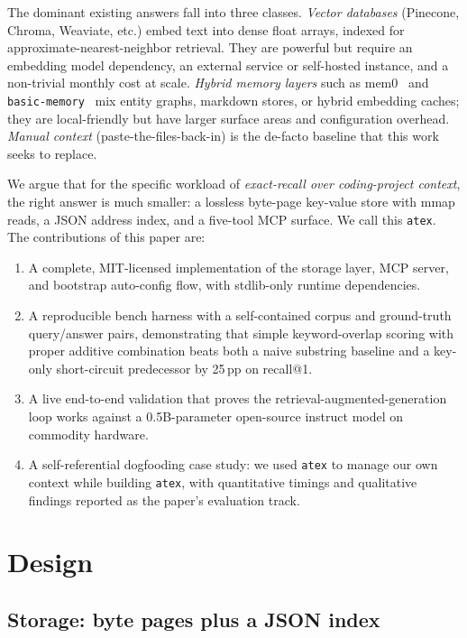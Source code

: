 \documentclass[10pt,letterpaper]{article}
\begin{document}
The dominant existing answers fall into three classes. \textit{Vector databases} (Pinecone, Chroma, Weaviate, etc.) embed text into dense float arrays, indexed for approximate-nearest-neighbor retrieval. They are powerful but require an embedding model dependency, an external service or self-hosted instance, and a non-trivial monthly cost at scale. \textit{Hybrid memory layers} such as mem0~\cite{mem0} and \texttt{basic-memory}~\cite{basicmemory} mix entity graphs, markdown stores, or hybrid embedding caches; they are local-friendly but have larger surface areas and configuration overhead. \textit{Manual context} (paste-the-files-back-in) is the de-facto baseline that this work seeks to replace.

We argue that for the specific workload of \emph{exact-recall over coding-project context}, the right answer is much smaller: a lossless byte-page key-value store with mmap reads, a JSON address index, and a five-tool MCP surface. We call this \texttt{atex}. The contributions of this paper are:

\begin{enumerate}[leftmargin=*]
\item A complete, MIT-licensed implementation of the storage layer, MCP server, and bootstrap auto-config flow, with stdlib-only runtime dependencies.
\item A reproducible bench harness with a self-contained corpus and ground-truth query/answer pairs, demonstrating that simple keyword-overlap scoring with proper additive combination beats both a naive substring baseline and a key-only short-circuit predecessor by 25\,pp on recall@1.
\item A live end-to-end validation that proves the retrieval-augmented-generation loop works against a 0.5B-parameter open-source instruct model on commodity hardware.
\item A self-referential dogfooding case study: we used \texttt{atex} to manage our own context while building \texttt{atex}, with quantitative timings and qualitative findings reported as the paper's evaluation track.
\end{enumerate}

\section{Design}
\label{sec:design}

\subsection{Storage: byte pages plus a JSON index}
\end{document}
